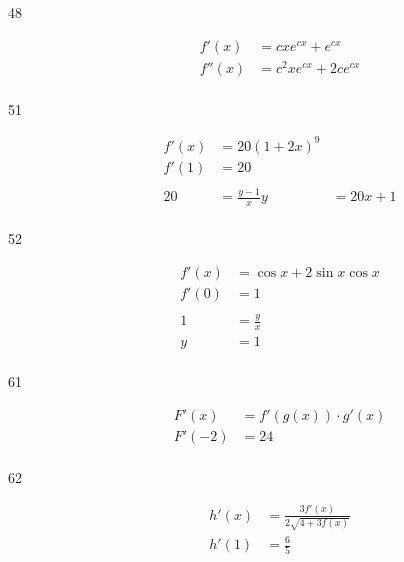 \documentclass[letterpaper]{exam}
\begin{document}
\begin{description}
    \item[48] 
      \begin{align*}
        f'(x)  & = cx e^{cx} + e^{cx} \\
        f''(x) & = c^2 x e^{cx} + 2 c e^{cx} \\
      \end{align*}


    \item[51] 
      \begin{align*}
        f'(x) & = 20 (1 + 2x)^9 \\
        f'(1) & = 20 \\
        \\
        20    & = \frac{y - 1}{x}
        y     & = 20x + 1 \\
      \end{align*}

    \item[52] 
      \begin{align*}
        f'(x) & = \cos x + 2 \sin x \cos x \\
        f'(0) & = 1 \\
        \\
        1     & = \frac{y}{x} \\
        y     & = 1 \\
      \end{align*}

    \item[61] 
      \begin{align*}
        F'(x)  & = f'(g(x)) \cdot g'(x) \\
        F'(-2) & = \boxed{ 24 } \\
      \end{align*}

    \item[62] 
      \begin{align*}
        h'(x) &= \frac{3 f'(x)}{2 \sqrt{4 + 3 f(x)}} \\
        h'(1) &= \boxed{ \frac{6}{5} } \\
      \end{align*}


\end{description}
\end{document}
